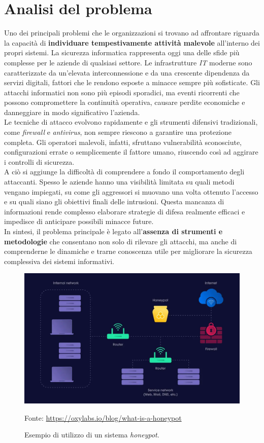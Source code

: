 \section{Analisi del problema}
Uno dei principali problemi che le organizzazioni si trovano ad affrontare riguarda la capacità di \textbf{individuare tempestivamente attività malevole} all'interno dei propri sistemi.  
La sicurezza informatica rappresenta oggi una delle sfide più complesse per le aziende di qualsiasi settore. Le infrastrutture \textit{IT} moderne sono caratterizzate da un'elevata interconnessione e da una crescente dipendenza da servizi digitali, fattori che le rendono esposte a minacce sempre più sofisticate. Gli attacchi informatici non sono più episodi sporadici, ma eventi ricorrenti che possono compromettere la continuità operativa, causare perdite economiche e danneggiare in modo significativo l'azienda.\\
Le tecniche di attacco evolvono rapidamente e gli strumenti difensivi tradizionali, come \textit{firewall} e \textit{antivirus}, non sempre riescono a garantire una protezione completa. Gli operatori malevoli, infatti, sfruttano vulnerabilità sconosciute, configurazioni errate o semplicemente il fattore umano, riuscendo così ad aggirare i controlli di sicurezza.\\  
A ciò si aggiunge la difficoltà di comprendere a fondo il comportamento degli attaccanti. Spesso le aziende hanno una visibilità limitata su quali metodi vengano impiegati, su come gli aggressori si muovano una volta ottenuto l'accesso e su quali siano gli obiettivi finali delle intrusioni. Questa mancanza di informazioni rende complesso elaborare strategie di difesa realmente efficaci e impedisce di anticipare possibili minacce future.\\
In sintesi, il problema principale è legato all'\textbf{assenza di strumenti e metodologie} che consentano non solo di rilevare gli attacchi, ma anche di comprenderne le dinamiche e trarne conoscenza utile per migliorare la sicurezza complessiva dei sistemi informativi.
\begin{figure}[H]
    \begin{center}\includegraphics[alt={Honeypot position}, width=\columnwidth]{img/honeypot.jpg}
    \caption{Esempio di utilizzo di un sistema \textit{honeypot}.}
    Fonte: \url{https://oxylabs.io/blog/what-is-a-honeypot}
    \end{center}
\end{figure}
\label{fig:honeypot}